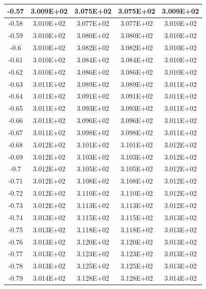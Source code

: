 \documentclass{article}
\begin{document}
\begin{center}
\begin{longtable}{|c|c|c|c|c|}
            -0.57 & 3.009E+02 & 3.075E+02 & 3.075E+02 & 3.009E+02 \\ \hline
            -0.58 & 3.010E+02 & 3.077E+02 & 3.077E+02 & 3.010E+02 \\ \hline
            -0.59 & 3.010E+02 & 3.080E+02 & 3.080E+02 & 3.010E+02 \\ \hline
            -0.6 & 3.010E+02 & 3.082E+02 & 3.082E+02 & 3.010E+02 \\ \hline
            -0.61 & 3.010E+02 & 3.084E+02 & 3.084E+02 & 3.010E+02 \\ \hline
            -0.62 & 3.010E+02 & 3.086E+02 & 3.086E+02 & 3.010E+02 \\ \hline
            -0.63 & 3.011E+02 & 3.089E+02 & 3.089E+02 & 3.011E+02 \\ \hline
            -0.64 & 3.011E+02 & 3.091E+02 & 3.091E+02 & 3.011E+02 \\ \hline
            -0.65 & 3.011E+02 & 3.093E+02 & 3.093E+02 & 3.011E+02 \\ \hline
            -0.66 & 3.011E+02 & 3.096E+02 & 3.096E+02 & 3.011E+02 \\ \hline
            -0.67 & 3.011E+02 & 3.098E+02 & 3.098E+02 & 3.011E+02 \\ \hline
            -0.68 & 3.012E+02 & 3.101E+02 & 3.101E+02 & 3.012E+02 \\ \hline
            -0.69 & 3.012E+02 & 3.103E+02 & 3.103E+02 & 3.012E+02 \\ \hline
            -0.7 & 3.012E+02 & 3.105E+02 & 3.105E+02 & 3.012E+02 \\ \hline
            -0.71 & 3.012E+02 & 3.108E+02 & 3.108E+02 & 3.012E+02 \\ \hline
            -0.72 & 3.012E+02 & 3.110E+02 & 3.110E+02 & 3.012E+02 \\ \hline
            -0.73 & 3.012E+02 & 3.113E+02 & 3.113E+02 & 3.012E+02 \\ \hline
            -0.74 & 3.013E+02 & 3.115E+02 & 3.115E+02 & 3.013E+02 \\ \hline
            -0.75 & 3.013E+02 & 3.118E+02 & 3.118E+02 & 3.013E+02 \\ \hline
            -0.76 & 3.013E+02 & 3.120E+02 & 3.120E+02 & 3.013E+02 \\ \hline
            -0.77 & 3.013E+02 & 3.123E+02 & 3.123E+02 & 3.013E+02 \\ \hline
            -0.78 & 3.013E+02 & 3.125E+02 & 3.125E+02 & 3.013E+02 \\ \hline
            -0.79 & 3.014E+02 & 3.128E+02 & 3.128E+02 & 3.014E+02 \\ \hline

\end{longtable}
\end{center}
\end{document}
